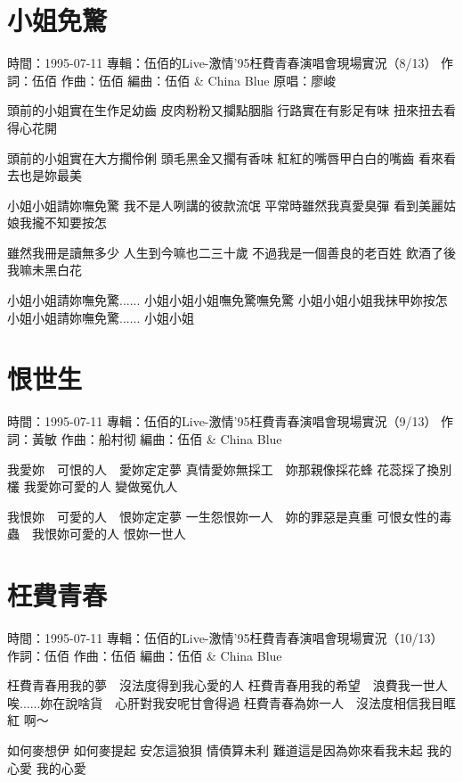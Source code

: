 \documentclass[UTF8,a4paper,oneside,twocolumn,12pt]{ctexbook}
\newcommand{\infopair}[2]{\textbullet #1：#2}
\newcommand{\zc}[1][伍佰]{\infopair{作詞}{#1}}
\newcommand{\zq}[1][伍佰]{\infopair{作曲}{#1}}
\newcommand{\bq}[1][伍佰]{\infopair{編曲}{#1}}
\newcommand{\zj}[1]{\infopair{專輯}{#1}}
\newcommand{\yc}[1]{\infopair{原唱}{#1}}
\newcommand{\sj}[1]{\infopair{時間}{#1}}
\newenvironment{info}{\begin{flushleft}\kaishu
	}
	{\end{flushleft}\normalsize\yahei\par}
\newenvironment{lyric}{
	}
{}
\begin{document}
\section{小姐免驚}
\begin{info}
	\sj{1995-07-11}
	\zj{伍佰的Live-激情'95枉費青春演唱會現場實況（8/13）}
	\zc
	\zq
	\bq[伍佰 \& China Blue]
	\yc{廖峻}
\end{info}
\begin{lyric}
	頭前的小姐實在生作足幼齒
	皮肉粉粉又攔點胭脂
	行路實在有影足有味
	扭來扭去看得心花開

	頭前的小姐實在大方擱伶俐
	頭毛黑金又擱有香味
	紅紅的嘴唇甲白白的嘴齒
	看來看去也是妳最美

	小姐小姐請妳嘸免驚
	我不是人咧講的彼款流氓
	平常時雖然我真愛臭彈
	看到美麗姑娘我攏不知要按怎

	雖然我冊是讀無多少
	人生到今嘛也二三十歲
	不過我是一個善良的老百姓
	飲酒了後我嘛未黑白花

	小姐小姐請妳嘸免驚......
	小姐小姐小姐嘸免驚嘸免驚
	小姐小姐小姐我抹甲妳按怎
	小姐小姐請妳嘸免驚......
	小姐小姐
\end{lyric}

\section{恨世生}
\begin{info}
	\sj{1995-07-11}
	\zj{伍佰的Live-激情'95枉費青春演唱會現場實況（9/13）}
	\zc[黃敏]
	\zq[船村彻]
	\bq[伍佰 \& China Blue]
\end{info}
\begin{lyric}
	我愛妳　可恨的人　愛妳定定夢
	真情愛妳無採工　妳那親像採花蜂
	花蕊採了換別欉 我愛妳可愛的人
	變做冤仇人

	我恨妳　可愛的人　恨妳定定夢
	一生怨恨妳一人　妳的罪惡是真重
	可恨女性的毒蟲　我恨妳可愛的人
	恨妳一世人
\end{lyric}

\section{枉費青春}
\begin{info}
	\sj{1995-07-11}
	\zj{伍佰的Live-激情'95枉費青春演唱會現場實況（10/13）}
	\zc
	\zq
	\bq[伍佰 \& China Blue]
\end{info}
\begin{lyric}
	枉費青春用我的夢　沒法度得到我心愛的人
	枉費青春用我的希望　浪費我一世人
	唉......妳在說啥貨　心肝對我安呢甘會得過
	枉費青春為妳一人　沒法度相信我目眶紅
	啊～

	如何麥想伊
	如何麥提起
	安怎這狼狽
	情債算未利
	難道這是因為妳來看我未起
	我的心愛
	我的心愛
\end{lyric}
\end{document}
